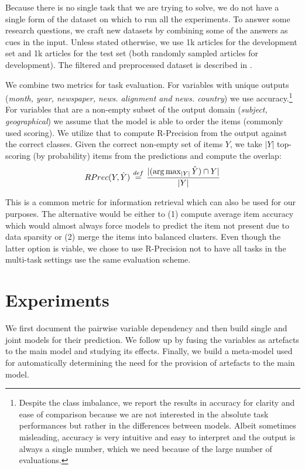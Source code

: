 Because there is no single task that we are trying to solve, we do not have a single form of the dataset on which to run all the experiments.
To answer some research questions, we craft new datasets by combining some of the answers as cues in the input.
Unless stated otherwise, we use 1k articles for the development set and 1k articles for the test set (both randomly sampled articles for development).
The filtered and preprocessed dataset is described in .

We combine two metrics for task evaluation.
For variables with unique outputs (\emph{month, year, newspaper, news. alignment and news. country}) we use accuracy.\footnote{
Despite the class imbalance, we report the results in accuracy for clarity and ease of comparison because we are not interested in the absolute task performances but rather in the differences between models.
Albeit sometimes misleading, accuracy is very intuitive and easy to interpret and the output is always a single number, which we need because of the large number of evaluations.
}
For variables that are a non-empty subset of the output domain (\emph{subject, geographical}) we assume that the model is able to order the items (commonly used scoring).
We utilize that to compute R-Precision from the output against the correct classes.
Given the correct non-empty set of items $Y$, we take $|Y|$ top-scoring (by probability) items from the predictions and compute the overlap:
$$
RPrec(Y, \hat{Y}) \defeq \frac{|(\arg \max_{|Y|}\hat{Y}) \cap Y|}{|Y|}
$$

This is a common metric for information retrieval \cite{Beitzel2009} which can also be used for our purposes.
The alternative would be either to (1) compute average item accuracy which would almost always force models to predict the item not present due to data sparsity or (2) merge the items into balanced clusters.
Even though the latter option is viable, we chose to use R-Precision not to have all tasks in the multi-task settings use the same evaluation scheme.

\section{Experiments} \label{sec:experiments}

We first document the pairwise variable dependency and then build single and joint models for their prediction.
We follow up by fusing the variables as artefacts to the main model and studying its effects.
Finally, we build a meta-model used for automatically determining the need for the provision of artefacts to the main model.

